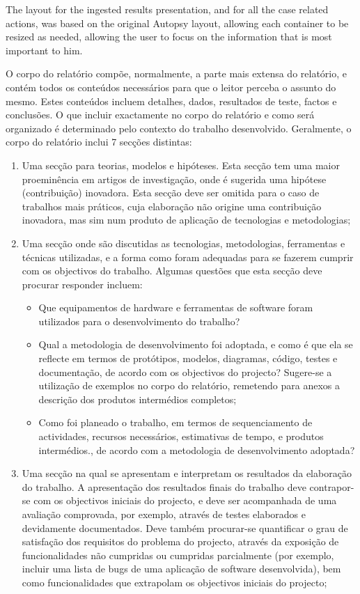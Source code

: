 The layout for the ingested results presentation, and for all the case related actions, was based on the original Autopsy layout, allowing each container to be resized as
needed, allowing the user to focus on the information that is most important to him.


\pagebreak

O corpo do relatório compõe, normalmente, a parte mais extensa do relatório, e contém todos os conteúdos necessários para que o leitor perceba o assunto do mesmo. Estes conteúdos incluem detalhes, dados, resultados de teste, factos e conclusões. O que incluir exactamente no corpo do relatório e como será organizado é determinado pelo contexto do trabalho desenvolvido. Geralmente, o corpo do relatório inclui 7 secções distintas:

\begin{enumerate}
 \item Uma secção para teorias, modelos e hipóteses. Esta secção tem uma maior proeminência em artigos de investigação, onde é sugerida uma hipótese (contribuição) inovadora. Esta secção deve ser omitida para o caso de trabalhos mais práticos, cuja elaboração não origine uma contribuição inovadora, mas sim num produto de aplicação de tecnologias e metodologias;
 \item Uma secção onde são discutidas as tecnologias, metodologias, ferramentas e técnicas utilizadas, e a forma como foram adequadas para se fazerem cumprir com os objectivos do trabalho. Algumas questões que esta secção deve procurar responder incluem:
 \begin{itemize}
  \item Que equipamentos de hardware e ferramentas de software foram utilizados para o desenvolvimento do trabalho?
  \item Qual a metodologia de desenvolvimento foi adoptada, e como é que ela se reflecte em termos de protótipos, modelos, diagramas, código, testes e documentação, de acordo com os objectivos do projecto? Sugere-se a utilização de exemplos no corpo do relatório, remetendo para anexos a descrição dos produtos intermédios completos;
  \item Como foi planeado o trabalho, em termos de sequenciamento de actividades, recursos necessários, estimativas de tempo, e produtos intermédios., de acordo com a metodologia de desenvolvimento adoptada?
 \end{itemize}
 \item Uma secção na qual se apresentam e interpretam os resultados da elaboração do trabalho. A apresentação dos resultados finais do trabalho deve contrapor-se com os objectivos iniciais do projecto, e deve ser acompanhada de uma avaliação comprovada, por exemplo, através de testes elaborados e devidamente documentados. Deve também procurar-se quantificar o grau de satisfação dos requisitos do problema do projecto, através da exposição de funcionalidades não cumpridas ou cumpridas parcialmente (por exemplo, incluir uma lista de bugs de uma aplicação de software desenvolvida), bem como funcionalidades que extrapolam os objectivos iniciais do projecto;

\end{enumerate}
